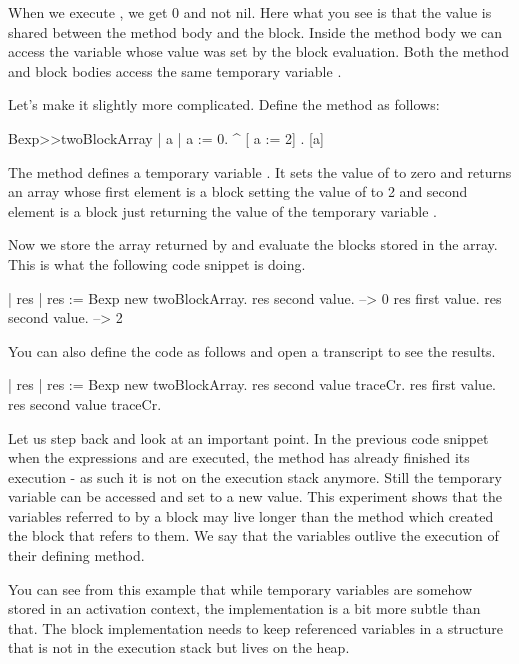 \documentclass[a4paper,10pt,twoside]{book}
\begin{document}
When we execute , we get 0 and not nil.
Here what you see is that the value is shared between the method body and the block. Inside the method body we can access the variable whose value was set by the block evaluation.
Both the method  and block bodies access the same temporary variable .

Let's make it slightly more complicated. Define the method  as follows:

\begin{code}{}
Bexp>>twoBlockArray
	| a |
	a := 0.
	^ {[ a := 2] . [a]}
\end{code}

The method  defines a temporary variable . It sets the value of 
to zero and returns an array whose first element is a block setting the value of  to 2 and second element is a block just returning the value of the temporary variable .

Now we store the array returned by  and evaluate the blocks stored in the array. This is what the following code snippet is doing.

\begin{code}{}
| res |
res := Bexp new twoBlockArray.
res second value. --> 0
res first value.
res second value. --> 2
\end{code}

You can also define the code as follows and open a transcript to see the results.

\begin{code}{}
| res |
res := Bexp new twoBlockArray.
res second value traceCr.
res first value.
res second value traceCr.
\end{code}

Let us step back and look at an important point.
In the previous code snippet when the expressions  and  are executed, the method  has already finished its execution - as such it is not on the execution stack anymore.  Still the temporary variable  can be accessed and set to a new value. This experiment shows that the variables referred to by a block may live longer than the method which created the block that refers to them. We say that the variables outlive the execution of their defining method.

 You can see from this example that while temporary variables are somehow stored in an activation context, the implementation is a bit more subtle than that. The block implementation needs to keep referenced variables in a structure that is not in the execution stack but lives on the heap. 
\end{document}
